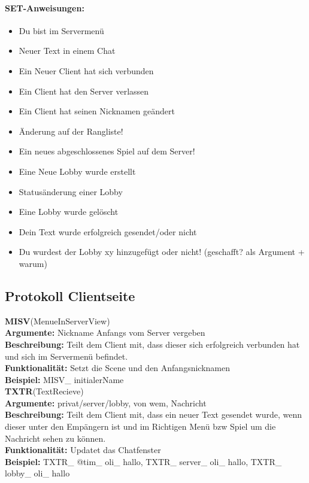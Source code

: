 \documentclass[a4paper, 12pt, oneside, headsepline=.5pt,footsepline=.5pt]{scrartcl}
\begin{document}
\paragraph{\textbf SET-Anweisungen:}
\begin{itemize}
\item Du bist im Servermenü
\item Neuer Text in einem Chat
\item Ein Neuer Client hat sich verbunden
\item Ein Client hat den Server verlassen
\item Ein Client hat seinen Nicknamen geändert
\item Änderung auf der Rangliste!
\item Ein neues abgeschlossenes Spiel auf dem Server!
\item Eine Neue Lobby wurde erstellt
\item Statusänderung einer Lobby
\item Eine Lobby wurde gelöscht
\item Dein Text wurde erfolgreich gesendet/oder nicht
\item Du wurdest der Lobby xy hinzugefügt oder nicht! (geschafft? als Argument + warum)
\end{itemize}


\subsection{Protokoll Clientseite}

{\large \textbf{MISV}(MenueInServerView)} \\
\hspace{4ex} \textbf{Argumente:} {Nickname Anfangs vom Server vergeben} \\
\hspace{4ex} \textbf{Beschreibung:} {Teilt dem Client mit, dass dieser sich erfolgreich verbunden hat und sich im Servermenü befindet.} \\
\hspace{4ex} \textbf{Funktionalität:} {Setzt die Scene und den Anfangsnicknamen}  \\
\hspace{4ex} \textbf{Beispiel:} {MISV\_ initialerName} \\

{\large \textbf{TXTR}(TextRecieve)} \\
\hspace{4ex} \textbf{Argumente:} {privat/server/lobby, von wem, Nachricht} \\
\hspace{4ex} \textbf{Beschreibung:} {Teilt dem Client mit, dass ein neuer Text gesendet wurde, wenn dieser unter den Empängern ist und im Richtigen Menü bzw Spiel um die Nachricht sehen zu können.} \\
\hspace{4ex} \textbf{Funktionalität:} {Updatet das Chatfenster}  \\
\hspace{4ex} \textbf{Beispiel:} {TXTR\_ @tim\_ oli\_ hallo, TXTR\_ server\_ oli\_ hallo, TXTR\_ lobby\_ oli\_ hallo} \\
\end{document}
